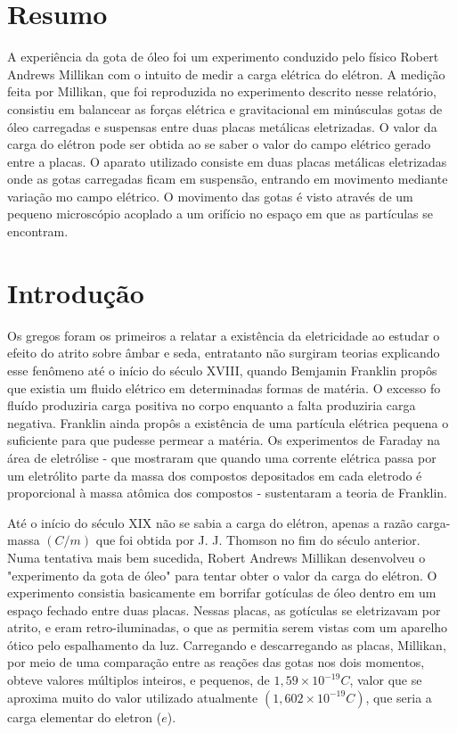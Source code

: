 \section{Resumo}
A experiência da gota de óleo foi um experimento conduzido pelo físico Robert Andrews Millikan com o intuito de medir a carga elétrica do elétron. A medição feita por Millikan, que foi reproduzida no experimento descrito nesse relatório, consistiu em balancear as forças elétrica e gravitacional em minúsculas gotas de óleo carregadas e suspensas entre duas placas metálicas eletrizadas. O valor da carga do elétron pode ser obtida ao se saber o valor do campo elétrico gerado entre a placas. 
O aparato utilizado consiste em duas placas metálicas eletrizadas onde as gotas carregadas ficam em suspensão, entrando em movimento mediante variação mo campo elétrico. O movimento das gotas é visto através de um pequeno microscópio acoplado a um orifício no espaço em que as partículas se encontram.
﻿\section{Introdução}
Os gregos foram os primeiros a relatar a existência da eletricidade ao estudar o efeito do atrito sobre âmbar e seda, entratanto não surgiram teorias explicando esse fenômeno até o início do século XVIII, quando Bemjamin Franklin propôs que existia um fluido elétrico em determinadas formas de matéria. O excesso fo fluído produziria carga positiva no corpo enquanto a falta produziria carga negativa. Franklin ainda propôs a existência de uma partícula elétrica pequena o suficiente para que pudesse permear a matéria. Os experimentos de Faraday na área de eletrólise - que mostraram que quando uma corrente elétrica passa por um eletrólito parte da massa dos compostos depositados em cada eletrodo é proporcional à massa atômica dos compostos - sustentaram a teoria de Franklin.

Até o início do século XIX não se sabia a carga do elétron, apenas a razão carga-massa $(C/m)$ que foi obtida por J. J. Thomson no fim do século anterior. Numa tentativa mais bem sucedida, Robert Andrews Millikan desenvolveu o "experimento da gota de óleo" para tentar obter o valor da carga do elétron. O experimento consistia basicamente em borrifar gotículas de óleo dentro em um espaço fechado entre duas placas. Nessas placas, as gotículas se eletrizavam por atrito, e eram retro-iluminadas, o que as permitia serem vistas com um aparelho ótico pelo espalhamento da luz. Carregando e descarregando as placas, Millikan, por meio de uma comparação entre as reações das gotas nos dois momentos, obteve valores múltiplos inteiros, e pequenos, de $1,59\times 10^{-19}C$, valor que se aproxima muito do valor utilizado atualmente $(1,602\times 10^{-19}C)$, que seria a carga elementar do eletron ($e$).

